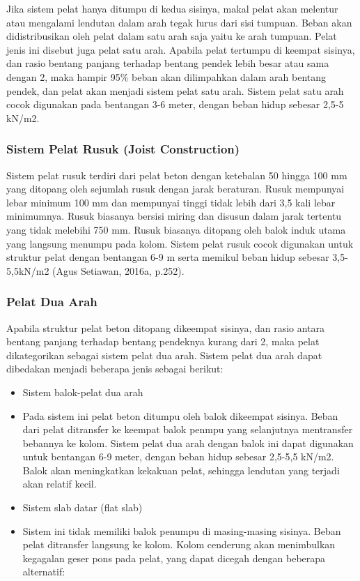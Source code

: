 \documentclass[../modul_skb.tex]{subfiles}
\begin{document}
Jika sistem pelat hanya ditumpu di kedua sisinya, makal pelat akan melentur atau mengalami lendutan dalam arah tegak lurus dari sisi tumpuan. Beban akan didistribusikan oleh pelat dalam satu arah saja yaitu ke arah tumpuan. Pelat jenis ini disebut juga pelat satu arah. Apabila pelat tertumpu di keempat sisinya, dan rasio bentang panjang terhadap bentang pendek lebih besar atau sama dengan 2, maka hampir 95\% beban akan dilimpahkan dalam arah bentang pendek, dan pelat akan menjadi sistem pelat satu arah. Sistem pelat satu arah cocok digunakan pada bentangan 3-6 meter, dengan beban hidup sebesar 2,5-5 kN/m2.

\subsubsection{Sistem Pelat Rusuk (Joist Construction)}

Sistem pelat rusuk terdiri dari pelat beton dengan ketebalan 50 hingga 100 mm yang ditopang oleh sejumlah rusuk dengan jarak beraturan. Rusuk mempunyai lebar minimum 100 mm dan mempunyai tinggi tidak lebih dari 3,5 kali lebar minimumnya. Rusuk biasanya bersisi miring dan disusun dalam jarak tertentu yang tidak melebihi 750 mm. Rusuk biasanya ditopang oleh balok induk utama yang langsung menumpu pada kolom. Sistem pelat rusuk cocok digunakan untuk struktur pelat dengan bentangan 6-9 m serta memikul beban hidup sebesar 3,5-5,5kN/m2 (Agus Setiawan, 2016a, p.252).

\subsubsection{Pelat Dua Arah}%

Apabila struktur pelat beton ditopang dikeempat sisinya, dan rasio antara bentang panjang terhadap bentang pendeknya kurang dari 2, maka pelat dikategorikan sebagai sistem pelat dua arah. Sistem pelat dua arah dapat dibedakan menjadi beberapa jenis sebagai berikut:


\begin{itemize}
	\item Sistem balok-pelat dua arah
	\item[] Pada sistem ini pelat beton ditumpu oleh balok dikeempat sisinya. Beban dari pelat ditransfer ke keempat balok penmpu yang selanjutnya mentransfer bebannya ke kolom. Sistem pelat dua arah dengan balok ini dapat digunakan untuk bentangan 6-9 meter, dengan beban hidup sebesar 2,5-5,5 kN/m2. Balok akan meningkatkan kekakuan pelat, sehingga lendutan yang terjadi akan relatif kecil.
	\item Sistem slab datar (flat slab)
	\item[] Sistem ini tidak memiliki balok penumpu di masing-masing sisinya. Beban pelat ditransfer langsung ke kolom. Kolom cenderung akan menimbulkan kegagalan geser pons pada pelat, yang dapat dicegah dengan beberapa alternatif:
\end{itemize}
\end{document}
